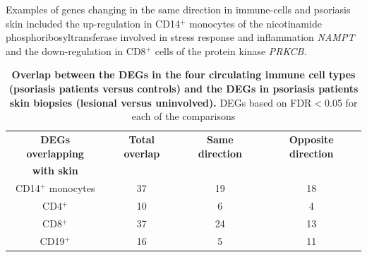 Examples of genes changing in the same direction in immune-cells and psoriasis skin included the up-regulation in CD14$^+$ monocytes of the nicotinamide phosphoribosyltransferase involved in stress response and inflammation \textit{NAMPT} \parencite{Presumey2013} and the down-regulation in CD8$^+$ cells of the protein kinase \textit{PRKCB}.
 

\begin{table}[htbp]
\centering
\begin{tabular}{@{} c c c c}
\toprule
\textbf{DEGs overlapping}   & \textbf{Total overlap}   & \textbf{Same direction}  & \textbf{Opposite direction}\\
\textbf{with skin}          &                          &                          &                            \\
\midrule 
\midrule
CD14$^+$ monocytes          & 37                       & 19                       &  18                         \\ 
CD4$^+$                     & 10                       & 6                        &  4                           \\
CD8$^+$                     & 37                       & 24                       &  13                           \\
CD19$^+$                    & 16                       & 5                        &  11                          \\
\bottomrule 
\end{tabular}
\medskip %
\caption[Overlap between the DEGs in the four circulating immune cell types (psoriasis patients versus controls) and the DEGs in psoriasis patients skin biopsies (lesional versus uninvolved).]{\textbf{Overlap between the DEGs in the four circulating immune cell types (psoriasis patients versus controls) and the DEGs in psoriasis patients skin biopsies (lesional versus uninvolved).} DEGs based on FDR$<$0.05 for each of the comparisons} 
\label{tab:RNAseq_overlap_circulating_versus_skin}
\end{table}
\bigskip %


